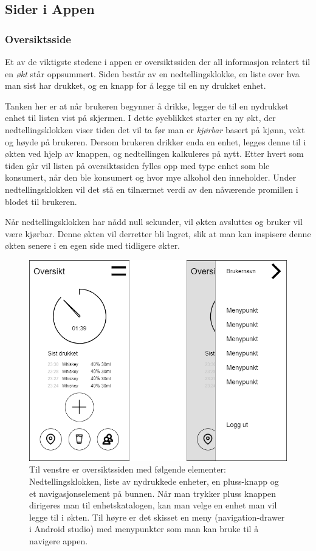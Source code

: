 \documentclass[12pt]{article}
\begin{document}
\subsection{Sider i Appen}
\subsubsection{Oversiktsside}
Et av de viktigste stedene i appen er oversiktssiden der all informasjon relatert til en \textit{økt} står oppsummert. Siden består av en nedtellingsklokke, en liste over hva man sist har drukket, og en knapp for å legge til en ny drukket enhet. 

Tanken her er at når brukeren begynner å drikke, legger de til en nydrukket enhet til listen vist på skjermen. I dette øyeblikket starter en ny økt, der nedtellingsklokken viser tiden det vil ta før man er \textit{kjørbar} basert på kjønn, vekt og høyde på brukeren. Dersom brukeren drikker enda en enhet, legges denne til i økten ved hjelp av knappen, og nedtellingen kalkuleres på nytt. Etter hvert som tiden går vil listen på oversiktssiden fylles opp med type enhet som ble konsumert, når den ble konsumert og hvor mye alkohol den inneholder. Under nedtellingsklokken vil det stå en tilnærmet verdi av den nåværende promillen i blodet til brukeren. 

Når nedtellingsklokken har nådd null sekunder, vil økten avsluttes og bruker vil være kjørbar. Denne økten vil derretter bli lagret, slik at man kan inspisere denne økten senere i en egen side med tidligere økter. 

\begin{figure}[H]
    \centering
    \includegraphics[scale=0.4]{images/lille_promille_frontpage.drawio.png}
    \caption{Til venstre er oversiktssiden med følgende elementer: Nedtellingsklokken, liste av nydrukkede enheter, en pluss-knapp og et navigasjonselement på bunnen. Når man trykker pluss knappen dirigeres man til enhetskatalogen, kan man velge en enhet man vil legge til i økten. Til høyre er det skisset en meny (navigation-drawer i Android studio) med menypunkter som man kan bruke til å navigere appen.}
\end{figure}
\end{document}
